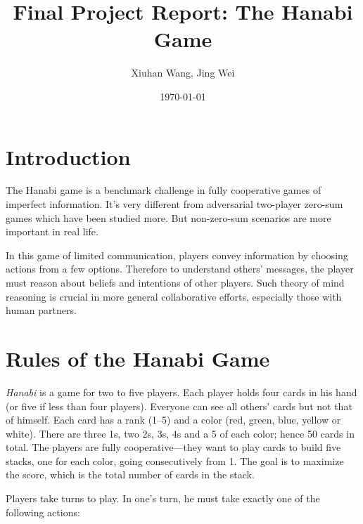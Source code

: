 \documentclass[12pt]{article}
\begin{document}
\begin{spacing}{1.15}
\title{\bf Final Project Report: The Hanabi Game}
\author{Xiuhan Wang, Jing Wei}
\date{\today}
\maketitle

\section{Introduction}
The Hanabi game is a benchmark challenge in fully cooperative games of imperfect information. It's very different from adversarial two-player zero-sum games which have been studied more. But non-zero-sum scenarios are more important in real life.

In this game of limited communication, players convey information by choosing actions from a few options. Therefore to understand others' messages, the player must reason about beliefs and intentions of other players. Such theory of mind reasoning is crucial in more general collaborative efforts, especially those with human partners. \citep{bard2020the}

\section{Rules of the Hanabi Game}

\textsl{Hanabi} is a game for two to five players. Each player holds four cards in his hand (or five if less than four players). Everyone can see all others' cards but not that of himself. Each card has a rank (1--5) and a color (red, green, blue, yellow or white). There are three 1s, two 2s, 3s, 4s and a 5 of each color; hence 50 cards in total. The players are fully cooperative---they want to play cards to build five stacks, one for each color, going consecutively from 1. The goal is to maximize the score, which is the total number of cards in the stack.

Players take turns to play. In one's turn, he must take exactly one of the following actions:


\end{spacing}
\end{document}
